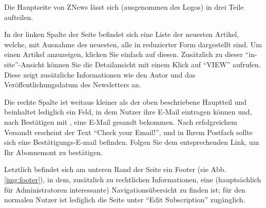 Die Hauptseite von ZNews lässt sich
(ausgenommen des Logos)
in drei Teile aufteilen.

In der linken Spalte der Seite befindet sich eine Liste
der neuesten Artikel,
welche,
mit Ausnahme des neuesten,
alle in reduzierter Form dargestellt sind.
Um einen Artikel anzuzeigen,
klicken Sie einfach auf diesen.
Zusätzlich zu dieser ``in-site''-Ansicht
können Sie die Detailansicht mit einem Klick auf ``VIEW''
aufrufen.
Diese zeigt zusätzliche Informationen wie den Autor
und das Veröffentlichungsdatum des Newsletters an.

Die rechte Spalte ist weitaus kleiner als der oben beschriebene
Hauptteil und beinhaltet lediglich ein Feld,
in dem Nutzer ihre E-Mail eintragen können und,
nach Bestätigen mit ,
eine E-Mail gesandt bekommen.
Nach erfolgreichem Versandt erscheint der Text
``Check your Email!'',
und in Ihrem Postfach sollte sich eine Bestätigungs-E-mail befinden.
Folgen Sie dem entsprechenden Link,
um Ihr Abonnemont zu bestätigen.

Letztlich befindet sich am unteren Rand der Seite ein Footer
(sie Abb. \ref{img:footer}),
in dem,
zusätzlich zu rechtlichen Informationen,
eine (hauptsächlich für Administratoren interessante)
Navigationsübersicht zu finden ist;
für den normalen Nutzer ist lediglich die Seite
unter ``Edit Subscription'' zugänglich.

